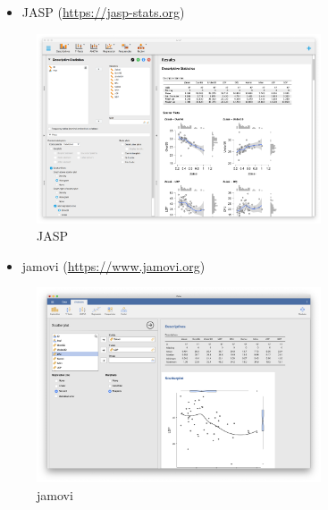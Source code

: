 \documentclass[
  a4paper,
  pandoc,
  ja=standard,
  jafont=haranoaji]{bxjsbook}
\providecommand{\tightlist}{%
  \setlength{\itemsep}{0pt}\setlength{\parskip}{0pt}}
\begin{document}
\begin{itemize}
\tightlist
\item
  JASP (\url{https://jasp-stats.org})
\end{itemize}

\begin{figure}

{\centering \includegraphics[width=0.75\textwidth,height=\textheight]{./Figs/AboutR/GUI_JASP.png}

}

\caption{\label{fig-aboutr_jasp}JASP}

\end{figure}

\begin{itemize}
\tightlist
\item
  jamovi (\url{https://www.jamovi.org})
\end{itemize}

\begin{figure}

{\centering \includegraphics[width=0.75\textwidth,height=\textheight]{./Figs/AboutR/GUI_jamovi.png}

}

\caption{\label{fig-aboutr_jamovi}jamovi}

\end{figure}
\end{document}
